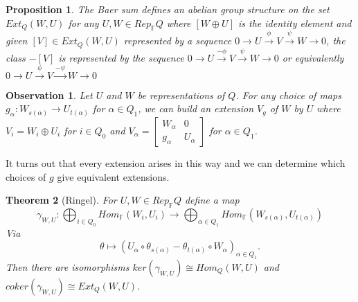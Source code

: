 \documentclass{book}
\newtheorem{theorem}{Theorem}[section]
\newtheorem{prop}[theorem]{Proposition}
\newtheorem* {obs*}{Observation}
\begin{document}
		\begin{prop}
			The Baer sum defines an abelian group structure on the set $Ext_Q(W,U)$ for any $U,W \in Rep_\mathbb{F}Q$ where $[W\oplus U]$ is the identity element and given $[V] \in Ext_Q(W,U)$ represented by a sequence $0 \rightarrow U \xrightarrow{\phi} V \xrightarrow{\psi} W \rightarrow 0$, the class $-[V]$ is represented by the sequence $0 \rightarrow U \xrightarrow{-\phi} V \xrightarrow{\psi} W \rightarrow 0$ or equivalently $0 \rightarrow U \xrightarrow{\phi} V \xrightarrow{-\psi} W \rightarrow 0$

		\end{prop}

		\begin{obs*}
			Let $U$ and $W$ be representations of $Q$. For any choice of maps $g_{\alpha} :W_{s(\alpha)} \rightarrow U_{t(\alpha)}$ for $\alpha \in Q_1$, we can build an extension $V_g$ of $W$ by $U$ where $V_i = W_i \oplus U_i$ for $i \in Q_0$ and $V_{\alpha} = \begin{bmatrix}W_{\alpha} & 0\\ g_{\alpha} & U_{\alpha} \end{bmatrix}$ for $\alpha \in Q_1$.
		\end{obs*}

	It turns out that every extension arises in this way and we can determine which choices of $g$ give equivalent extensions. 

		\begin{theorem}[Ringel] 
			For $U,W \in Rep_{\mathbb{F}} Q$ define a map $$\gamma_{W,U}:\bigoplus_{i \in Q_{0}} Hom_{\mathbb{F}}(W_i,U_i) \rightarrow \bigoplus_{\alpha \in Q_{1}} Hom_{\mathbb{F}}(W_{s(\alpha)},U_{t(\alpha)}) $$ Via $$ \theta \mapsto (U_{\alpha} \circ \theta_{s(\alpha)} - \theta_{t(\alpha)} \circ W_{\alpha})_{\alpha \in Q_1}.$$ Then there are isomorphisms $ker(\gamma_{W,U}) \cong Hom_Q(W,U)$ and $coker(\gamma_{W,U}) \cong Ext_Q(W,U)$.
		\end{theorem}
		
\end{document}
